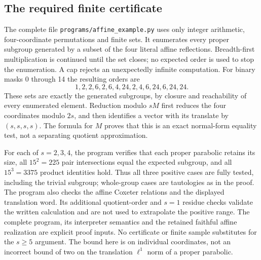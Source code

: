 \subsection*{The required finite certificate}
The complete file \texttt{programs/affine\_example.py} uses only
integer arithmetic, four-coordinate permutations and finite sets.
It enumerates every proper subgroup generated by a subset of the
four literal affine reflections. Breadth-first multiplication is
continued until the set closes; no expected order is used to stop
the enumeration. A cap rejects an unexpectedly infinite computation.
For binary masks 0 through 14 the resulting orders are
\[
 1,2,2,6,2,6,4,24,2,4,6,24,6,24,24.
\]
These sets are exactly the generated subgroups, by closure and
reachability of every enumerated element. Reduction modulo $sM$
first reduces the four coordinates modulo $2s$, and then identifies
a vector with its translate by $(s,s,s,s)$. The formula for $M$
proves that this is an exact normal-form equality test, not a
separating quotient approximation.

For each of $s=2,3,4$, the program verifies that each proper parabolic
retains its size, all $15^2=225$ pair intersections equal the expected
subgroup, and all $15^3=3375$ product identities hold. Thus all three
positive cases are fully tested, including the trivial subgroup;
whole-group cases are tautologies as in the proof. The program also
checks the affine Coxeter relations and the displayed translation
word. Its additional quotient-order and $s=1$ residue checks validate
the written calculation and are not used to extrapolate the positive
range. The complete program, its interpreter semantics and the
retained faithful affine realization are explicit proof inputs.
No certificate or finite sample substitutes for the $s\geq5$ argument.
The bound here is on individual coordinates, not an incorrect bound
of two on the translation $\ell^1$ norm of a proper parabolic.




